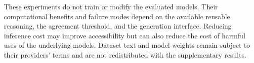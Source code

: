 These experiments do not train or modify the evaluated models. Their computational benefits and failure modes depend on the available reusable reasoning, the agreement threshold, and the generation interface. Reducing inference cost may improve accessibility but can also reduce the cost of harmful uses of the underlying models. Dataset text and model weights remain subject to their providers' terms and are not redistributed with the supplementary results.
